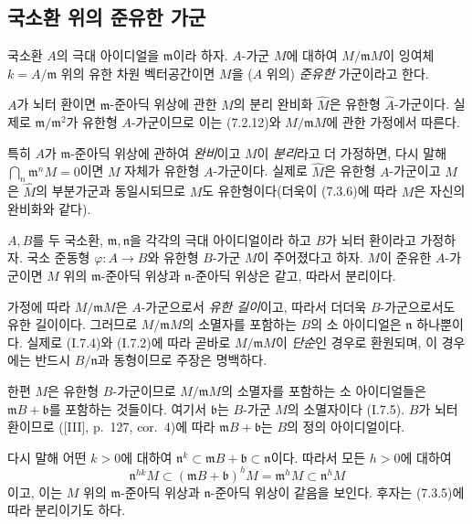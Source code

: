 \subsection{국소환 위의 준유한 가군}
\label{subsection:0.7.4-ko}

\begin{definition}[7.4.1]
\label{0.7.4.1-ko}
국소환 $A$의 극대 아이디얼을 $\mathfrak m$이라 하자. $A$-가군
$M$에 대하여 $M/\mathfrak mM$이 잉여체 $k=A/\mathfrak m$ 위의
유한 차원 벡터공간이면 $M$을 ($A$ 위의) \emph{준유한} 가군이라고
한다.
\end{definition}

$A$가 뇌터 환이면 $\mathfrak m$-준아딕 위상에 관한 $M$의 분리
완비화 $\widehat M$은 유한형 $\widehat A$-가군이다. 실제로
$\mathfrak m/\mathfrak m^2$가 유한형 $A$-가군이므로 이는
(7.2.12)와 $M/\mathfrak mM$에 관한 가정에서 따른다.

특히 $A$가 $\mathfrak m$-준아딕 위상에 관하여 \emph{완비}이고
$M$이 \emph{분리}라고 더 가정하면, 다시 말해
$\bigcap_n\mathfrak m^nM=0$이면 $M$ 자체가 유한형 $A$-가군이다.
실제로 $\widehat M$은 유한형 $A$-가군이고 $M$은 $\widehat M$의
부분가군과 동일시되므로 $M$도 유한형이다(더욱이 (7.3.6)에 따라
$M$은 자신의 완비화와 같다).

\begin{proposition}[7.4.2]
\label{0.7.4.2-ko}
$A,B$를 두 국소환, $\mathfrak m,\mathfrak n$을 각각의 극대
아이디얼이라 하고 $B$가 뇌터 환이라고 가정하자. 국소 준동형
$\varphi:A\to B$와 유한형 $B$-가군 $M$이 주어졌다고 하자. $M$이
준유한 $A$-가군이면 $M$ 위의 $\mathfrak m$-준아딕 위상과
$\mathfrak n$-준아딕 위상은 같고, 따라서 분리이다.
\end{proposition}

가정에 따라 $M/\mathfrak mM$은 $A$-가군으로서 \emph{유한 길이}이고,
따라서 더더욱 $B$-가군으로서도 유한 길이이다. 그러므로
$M/\mathfrak mM$의 소멸자를 포함하는 $B$의 소 아이디얼은
$\mathfrak n$ 하나뿐이다. 실제로 (I.7.4)와 (I.7.2)에 따라 곧바로
$M/\mathfrak mM$이 \emph{단순}인 경우로 환원되며, 이 경우에는
반드시 $B/\mathfrak n$과 동형이므로 주장은 명백하다.

한편 $M$은 유한형 $B$-가군이므로 $M/\mathfrak mM$의 소멸자를
포함하는 소 아이디얼들은 $\mathfrak mB+\mathfrak b$를 포함하는
것들이다. 여기서 $\mathfrak b$는 $B$-가군 $M$의 소멸자이다
(I.7.5). $B$가 뇌터 환이므로 ([III], p.~127, cor.~4)에 따라
$\mathfrak mB+\mathfrak b$는 $B$의 정의 아이디얼이다.


다시 말해 어떤 $k>0$에 대하여
$\mathfrak n^k\subset\mathfrak mB+\mathfrak b\subset\mathfrak n$이다.
따라서 모든 $h>0$에 대하여
\[
  \mathfrak n^{hk}M
  \subset(\mathfrak mB+\mathfrak b)^hM
  =\mathfrak m^hM
  \subset\mathfrak n^hM
\]
이고, 이는 $M$ 위의 $\mathfrak m$-준아딕 위상과
$\mathfrak n$-준아딕 위상이 같음을 보인다. 후자는 (7.3.5)에 따라
분리이기도 하다.

